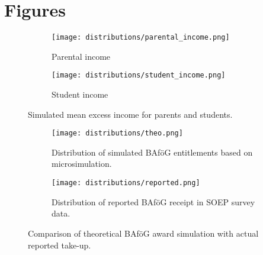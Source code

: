 \newpage
\section{Figures} \label{appendix:figures}
\renewcommand{\thefigure}{\thesection \arabic{figure}}
\setcounter{figure}{0}

\begin{figure}[!htbp]
  \centering
  \begin{subfigure}[t]{0.42\linewidth}
    \texttt{[image: distributions/parental\_income.png]}
    \caption{Parental income}
    \label{fig:parents-income-distribution}
  \end{subfigure}
  \hfill
  \begin{subfigure}[t]{0.42\linewidth}
    \texttt{[image: distributions/student\_income.png]}
    \caption{Student income}
    \label{fig:student-income-distribution}
  \end{subfigure}
  \caption{Simulated mean excess income for parents and students.}
  \label{fig:income-distributions}
\end{figure}


\begin{figure}[!htbp]
  \centering
  \begin{subfigure}[t]{0.42\linewidth}
    \texttt{[image: distributions/theo.png]}
    \caption{Distribution of simulated BAföG entitlements based on microsimulation.}
    \label{fig:simulated_distribution}
  \end{subfigure}
  \hfill
  \begin{subfigure}[t]{0.42\linewidth}
    \texttt{[image: distributions/reported.png]}
    \caption{Distribution of reported BAföG receipt in SOEP survey data.}
    \label{fig:reported_distribution}
  \end{subfigure}
  \caption{Comparison of theoretical BAföG award simulation with actual reported take-up.}
  \label{fig:bafoeg_distribution_comparison}
\end{figure}

